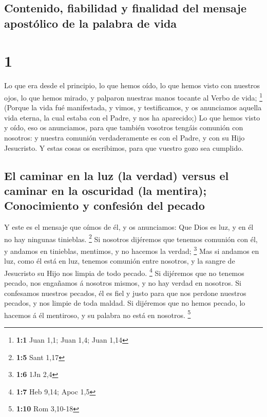 \hypertarget{contenido-fiabilidad-y-finalidad-del-mensaje-apostuxf3lico-de-la-palabra-de-vida}{%
\subsection{Contenido, fiabilidad y finalidad del mensaje apostólico de
la palabra de
vida}\label{contenido-fiabilidad-y-finalidad-del-mensaje-apostuxf3lico-de-la-palabra-de-vida}}

\hypertarget{section}{%
\section{1}\label{section}}

 Lo que era desde el principio, lo que hemos oído, lo que
hemos visto con nuestros ojos, lo que hemos mirado, y palparon nuestras
manos tocante al Verbo de vida; \footnote{\textbf{1:1} Juan 1,1; Juan
  1,4; Juan 1,14}  (Porque la vida fué manifestada, y
vimos, y testificamos, y os anunciamos aquella vida eterna, la cual
estaba con el Padre, y nos ha aparecido;)  Lo que hemos
visto y oído, eso os anunciamos, para que también vosotros tengáis
comunión con nosotros: y nuestra comunión verdaderamente es con el
Padre, y con su Hijo Jesucristo.  Y estas cosas os
escribimos, para que vuestro gozo sea cumplido.

\hypertarget{el-caminar-en-la-luz-la-verdad-versus-el-caminar-en-la-oscuridad-la-mentira-conocimiento-y-confesiuxf3n-del-pecado}{%
\subsection{El caminar en la luz (la verdad) versus el caminar en la
oscuridad (la mentira); Conocimiento y confesión del
pecado}\label{el-caminar-en-la-luz-la-verdad-versus-el-caminar-en-la-oscuridad-la-mentira-conocimiento-y-confesiuxf3n-del-pecado}}

 Y este es el mensaje que oímos de él, y os anunciamos:
Que Dios es luz, y en él no hay ningunas tinieblas. \footnote{\textbf{1:5}
  Sant 1,17}  Si nosotros dijéremos que tenemos comunión
con él, y andamos en tinieblas, mentimos, y no hacemos la verdad;
\footnote{\textbf{1:6} 1Jn 2,4}  Mas si andamos en luz,
como él está en luz, tenemos comunión entre nosotros, y la sangre de
Jesucristo su Hijo nos limpia de todo pecado. \footnote{\textbf{1:7} Heb
  9,14; Apoc 1,5}  Si dijéremos que no tenemos pecado, nos
engañamos á nosotros mismos, y no hay verdad en nosotros. 
Si confesamos nuestros pecados, él es fiel y justo para que nos perdone
nuestros pecados, y nos limpie de toda maldad.  Si
dijéremos que no hemos pecado, lo hacemos á él mentiroso, y su palabra
no está en nosotros. \footnote{\textbf{1:10} Rom 3,10-18}

